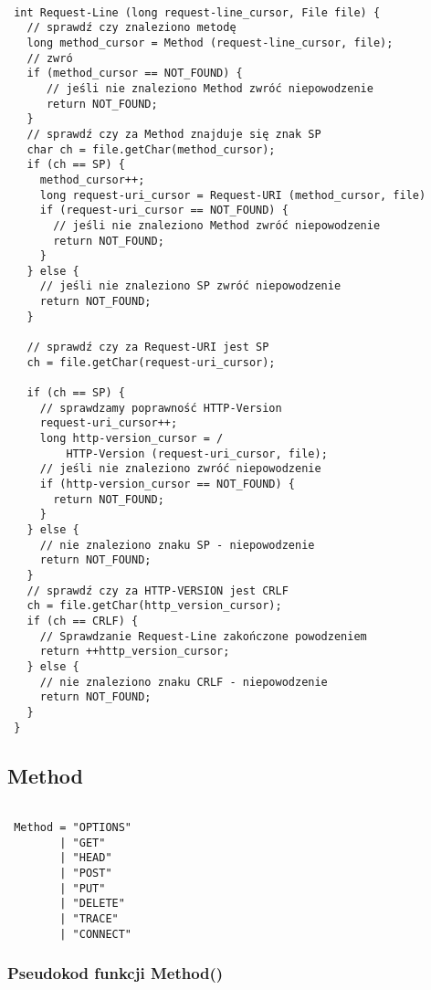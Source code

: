 \documentclass[a4paper,11pt]{report}
\begin{document}
\begin{lstlisting}

 int Request-Line (long request-line_cursor, File file) {
   // sprawdź czy znaleziono metodę
   long method_cursor = Method (request-line_cursor, file);
   // zwró
   if (method_cursor == NOT_FOUND) {
      // jeśli nie znaleziono Method zwróć niepowodzenie
      return NOT_FOUND;
   }
   // sprawdź czy za Method znajduje się znak SP
   char ch = file.getChar(method_cursor);
   if (ch == SP) {
     method_cursor++;
     long request-uri_cursor = Request-URI (method_cursor, file)
     if (request-uri_cursor == NOT_FOUND) {
       // jeśli nie znaleziono Method zwróć niepowodzenie
       return NOT_FOUND;
     }
   } else {
     // jeśli nie znaleziono SP zwróć niepowodzenie
     return NOT_FOUND;
   }
   
   // sprawdź czy za Request-URI jest SP
   ch = file.getChar(request-uri_cursor);
   
   if (ch == SP) {
     // sprawdzamy poprawność HTTP-Version
     request-uri_cursor++;
     long http-version_cursor = /
         HTTP-Version (request-uri_cursor, file);
     // jeśli nie znaleziono zwróć niepowodzenie     
     if (http-version_cursor == NOT_FOUND) {
       return NOT_FOUND;
     }
   } else {
     // nie znaleziono znaku SP - niepowodzenie
     return NOT_FOUND;   
   }
   // sprawdź czy za HTTP-VERSION jest CRLF
   ch = file.getChar(http_version_cursor);
   if (ch == CRLF) {
     // Sprawdzanie Request-Line zakończone powodzeniem
     return ++http_version_cursor; 
   } else {
     // nie znaleziono znaku CRLF - niepowodzenie
     return NOT_FOUND;   
   }
 }

\end{lstlisting}

\subsection{Method}

\begin{lstlisting}

 Method = "OPTIONS" 
        | "GET"
        | "HEAD"
        | "POST"
        | "PUT"
        | "DELETE"
        | "TRACE"
        | "CONNECT"

\end{lstlisting}

\subsubsection{Pseudokod funkcji Method()}
\end{document}
